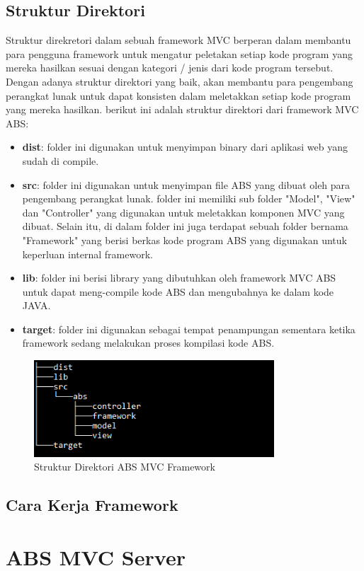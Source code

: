 \subsection{Struktur Direktori}
Struktur direkretori dalam sebuah framework MVC berperan dalam membantu para pengguna framework untuk mengatur peletakan setiap kode program yang mereka hasilkan sesuai dengan kategori / jenis dari kode program tersebut. Dengan adanya struktur direktori yang baik, akan membantu para pengembang perangkat lunak untuk dapat konsisten dalam meletakkan setiap kode program yang mereka hasilkan. berikut ini adalah struktur direktori dari framework MVC ABS:

\begin{itemize}
    \item \textbf{dist}: folder ini digunakan untuk menyimpan binary dari aplikasi web yang sudah di compile.
    \item \textbf{src}: folder ini digunakan untuk menyimpan file ABS yang dibuat oleh para pengembang perangkat lunak. folder ini memiliki sub folder "Model", "View" dan "Controller" yang digunakan untuk meletakkan komponen MVC yang dibuat. Selain itu, di dalam folder ini juga terdapat sebuah folder bernama "Framework" yang berisi berkas kode program ABS yang digunakan untuk keperluan internal framework.
    \item \textbf{lib}: folder ini berisi library yang dibutuhkan oleh framework MVC ABS untuk dapat meng-compile kode ABS dan mengubahnya ke dalam kode JAVA.
    \item \textbf{target}: folder ini digunakan sebagai tempat penampungan sementara ketika framework sedang melakukan proses kompilasi kode ABS.
\end{itemize}

\begin{figure}
    \centering
    \includegraphics[width=0.8\textwidth]
        {img/struktur-direktori.png}
    \caption{Struktur Direktori ABS MVC Framework}
\end{figure}

\subsection{Cara Kerja Framework}


\section{ABS MVC Server}
